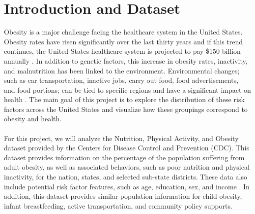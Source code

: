 \documentclass{article}
\begin{document}
 

	
	
	\section{Introduction and Dataset}
		\label{introduction}
		
		Obesity is a major challenge facing the healthcare system in the United States. Obesity rates have risen significantly over the last thirty years and if this trend continues, the United States healthcare system is projected to pay \$150 billion annually \cite{hurt2010obesity}.
		In addition to genetic factors, this increase in obesity rates, inactivity, and malnutrition has been linked to the environment. 
		Environmental changes; such as car transportation, inactive jobs, carry out food, food advertisements, and food portions; can be tied to specific regions and have a significant impact on health \cite{whyobesityhealthproblem, understandingadultoverweight}. 
		The main goal of this project is to explore the distribution of these risk factors across the United States and visualize how these groupings correspond to obesity and health.
		\\\\
		For this project, we will analyze the Nutrition, Physical Activity, and Obesity dataset provided by the Centers for Disease Control and Prevention (CDC).
		This dataset provides information on the percentage of the population suffering from adult obesity, as well as associated behaviors, such as poor nutrition and physical inactivity, for the nation, states, and selected sub-state districts. 
		These data also include potential risk factor features, such as age, education, sex, and income \cite{nutphysactobesitydata}.
		In addition, this dataset provides similar population information for child obesity, infant breastfeeding, active transportation, and community policy supports.
		
\end{document}
